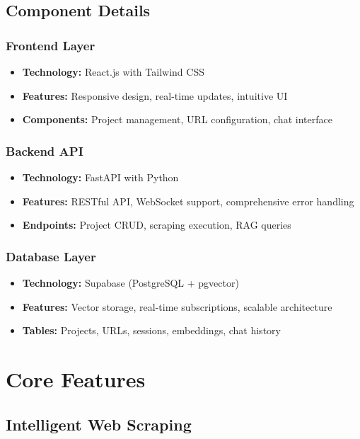 \documentclass[12pt,a4paper]{report}
\begin{document}
\section{Component Details}

\subsection{Frontend Layer}
\begin{itemize}
    \item \textbf{Technology:} React.js with Tailwind CSS
    \item \textbf{Features:} Responsive design, real-time updates, intuitive UI
    \item \textbf{Components:} Project management, URL configuration, chat interface
\end{itemize}

\subsection{Backend API}
\begin{itemize}
    \item \textbf{Technology:} FastAPI with Python
    \item \textbf{Features:} RESTful API, WebSocket support, comprehensive error handling
    \item \textbf{Endpoints:} Project CRUD, scraping execution, RAG queries
\end{itemize}

\subsection{Database Layer}
\begin{itemize}
    \item \textbf{Technology:} Supabase (PostgreSQL + pgvector)
    \item \textbf{Features:} Vector storage, real-time subscriptions, scalable architecture
    \item \textbf{Tables:} Projects, URLs, sessions, embeddings, chat history
\end{itemize}

\chapter{Core Features}

\section{Intelligent Web Scraping}
\end{document}
